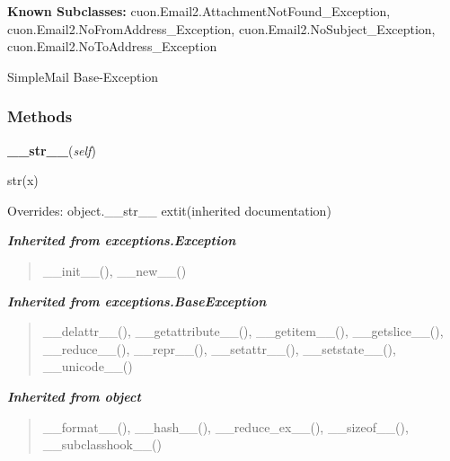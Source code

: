 \textbf{Known Subclasses:}
cuon.Email2.AttachmentNotFound\_Exception,
    cuon.Email2.NoFromAddress\_Exception,
    cuon.Email2.NoSubject\_Exception,
    cuon.Email2.NoToAddress\_Exception

SimpleMail Base-Exception



  \subsubsection{Methods}

    \vspace{0.5ex}

\hspace{.8\funcindent}\begin{boxedminipage}{\funcwidth}

    \raggedright \textbf{\_\_str\_\_}(\textit{self})

\setlength{\parskip}{2ex}
    str(x)

\setlength{\parskip}{1ex}
      Overrides: object.\_\_str\_\_ 	extit{(inherited documentation)}

    \end{boxedminipage}


\large{\textbf{\textit{Inherited from exceptions.Exception}}}

\begin{quote}
\_\_init\_\_(), \_\_new\_\_()
\end{quote}

\large{\textbf{\textit{Inherited from exceptions.BaseException}}}

\begin{quote}
\_\_delattr\_\_(), \_\_getattribute\_\_(), \_\_getitem\_\_(), \_\_getslice\_\_(), \_\_reduce\_\_(), \_\_repr\_\_(), \_\_setattr\_\_(), \_\_setstate\_\_(), \_\_unicode\_\_()
\end{quote}

\large{\textbf{\textit{Inherited from object}}}

\begin{quote}
\_\_format\_\_(), \_\_hash\_\_(), \_\_reduce\_ex\_\_(), \_\_sizeof\_\_(), \_\_subclasshook\_\_()
\end{quote}


